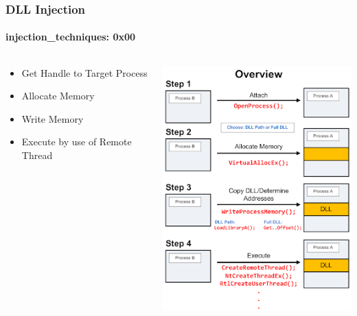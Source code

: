 \documentclass[aspectratio=169]{beamer}
\begin{document}
\begin{frame}
  \frametitle{DLL Injection}
  \framesubtitle{injection\_techniques: 0x00}
  \begin{columns}
    \begin{column}{.3\textwidth}
      \begin{itemize}
      \item{Get Handle to Target Process}
      \item{Allocate Memory}
      \item{Write Memory}
      \item{Execute by use of Remote Thread} 
      \end{itemize}
    \end{column}
    \hfill
    \begin{column}{.7\textwidth}
      \begin{center}
        \includegraphics[scale=0.5]{dll-injection}
      \end{center}
    \end{column}
  \end{columns}
\end{frame}
\end{document}
